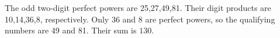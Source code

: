 The odd two-digit perfect powers are 25,27,49,81. Their digit products are 10,14,36,8, respectively. Only 36 and 8 are perfect powers, so the qualifying numbers are 49 and 81. Their sum is $\boxed{130}$.
